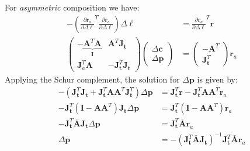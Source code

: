 For \emph{asymmetric} composition we have:
\begin{equation}
    \begin{aligned}
    	-\left( \frac{\partial \mathbf{r}_a}{\partial \Delta \boldsymbol{\ell}}^T \frac{\partial \mathbf{r}_a}{\partial \Delta \boldsymbol{\ell}} \right) \Delta \boldsymbol{\ell} & = \frac{\partial \mathbf{r}_a}{\partial \Delta \boldsymbol{\ell}}^T \mathbf{r}
    	\\
        \begin{pmatrix}
            -\underbrace{\mathbf{A}^T \mathbf{A}}_{\mathbf{I}} & \mathbf{A}^T \mathbf{J}_{\mathbf{t}}
            \\
            \mathbf{J}_a^T \mathbf{A} & -\mathbf{J}_{\mathbf{t}}^T \mathbf{J}_{\mathbf{t}}
        \end{pmatrix}
        \begin{pmatrix}
            \Delta\mathbf{c}
            \\
            \Delta\mathbf{p}
        \end{pmatrix}
        & =
        \begin{pmatrix}
            -\mathbf{A}^T
            \\
            \mathbf{J}_{\mathbf{t}}^T
        \end{pmatrix} \mathbf{r}_a
    \label{eq:asymmetric_structure}
    \end{aligned}
\end{equation}
Applying the Schur complement, the solution for $\Delta\mathbf{p}$ is given by:
\begin{equation}
    \begin{aligned}
        -(\mathbf{J}_{\mathbf{t}}^T\mathbf{J}_{\mathbf{t}} + \mathbf{J}_{\mathbf{t}}^T\mathbf{A}\mathbf{A}^T\mathbf{J}_{\mathbf{t}}^T) \Delta \mathbf{p} & = \mathbf{J}_{\mathbf{t}}^T\mathbf{r} - \mathbf{J}_{\mathbf{t}}^T\mathbf{A} \mathbf{A}^T \mathbf{r}_a
        \\
        -\mathbf{J}_{\mathbf{t}}^T(\mathbf{I} - \mathbf{A} \mathbf{A}^T)\mathbf{J}_{\mathbf{t}} \Delta \mathbf{p} & = \mathbf{J}_{\mathbf{t}}^T(\mathbf{I} - \mathbf{A} \mathbf{A}^T)\mathbf{r}_a
        \\
        -\mathbf{J}_{\mathbf{t}}^T\bar{\mathbf{A}}\mathbf{J}_{\mathbf{t}} \Delta \mathbf{p} & = \mathbf{J}_{\mathbf{t}}^T\bar{\mathbf{A}}\mathbf{r}_a
        \\
        \Delta \mathbf{p} & = -\left( \mathbf{J}_{\mathbf{t}}^T\bar{\mathbf{A}}\mathbf{J}_{\mathbf{t}} \right)^{-1} \mathbf{J}_{\mathbf{t}}^T\bar{\mathbf{A}}\mathbf{r}_a
    \label{eq:asymmetric_schur_solution1}
    \end{aligned}
\end{equation}
